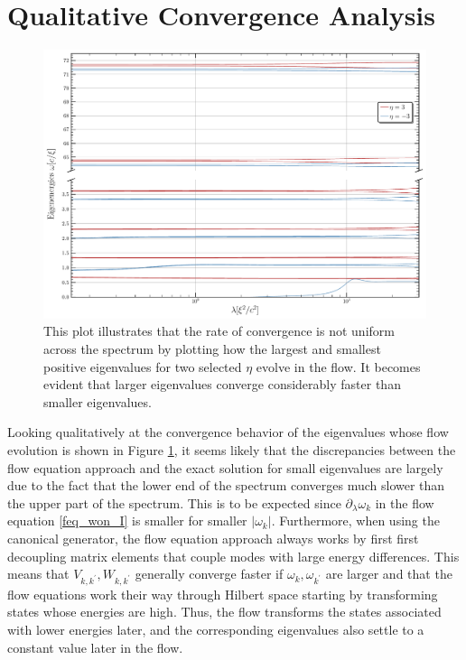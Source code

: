 \section{Qualitative Convergence Analysis}
\begin{figure}[H]
    \centering
    \includegraphics[width=\textwidth]{figures/plots/PDF/Convergence_analysis,N=40.pdf}
    \caption[Convergence behavior of the spectrum for selected $\eta$]{This plot illustrates that the rate of convergence is not uniform across the spectrum by plotting how the largest and smallest positive eigenvalues for two selected $\eta$ evolve in the flow. It becomes evident that larger eigenvalues converge considerably faster than smaller eigenvalues.}
    \label{ConvergenceRate}
\end{figure}
Looking qualitatively at the convergence behavior of the eigenvalues whose flow evolution is shown in Figure \ref{ConvergenceRate}, it seems likely that the discrepancies between the flow equation approach and the exact solution for small eigenvalues are largely due to the fact that the lower end of the spectrum converges much slower than the upper part of the spectrum. This is to be expected since $\partial_\lambda\omega_k$ in the flow equation \ref{feq_won_I} is smaller for smaller $|\omega_k|$. Furthermore, when using the canonical generator, the flow equation approach always works by first first decoupling matrix elements that couple modes with large energy differences. This means that $V_{k,k^\prime},W_{k,k^\prime}$ generally converge faster if $\omega_k,\omega_{k^\prime}$ are larger and that the flow equations work their way through Hilbert space starting by transforming states whose energies are high. Thus, the flow transforms the states associated with lower energies later, and the corresponding eigenvalues also settle to a constant value later in the flow.

